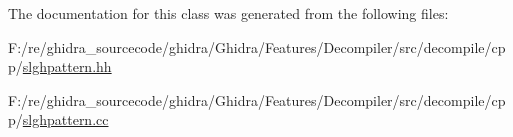 The documentation for this class was generated from the following files\+:\begin{DoxyCompactItemize}
\item 
F\+:/re/ghidra\+\_\+sourcecode/ghidra/\+Ghidra/\+Features/\+Decompiler/src/decompile/cpp/\mbox{\hyperlink{slghpattern_8hh}{slghpattern.\+hh}}\item 
F\+:/re/ghidra\+\_\+sourcecode/ghidra/\+Ghidra/\+Features/\+Decompiler/src/decompile/cpp/\mbox{\hyperlink{slghpattern_8cc}{slghpattern.\+cc}}\end{DoxyCompactItemize}
